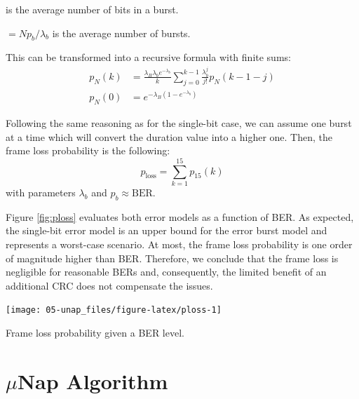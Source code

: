 \documentclass[twoside,nohyper]{tufte-book}
\providecommand{\tightlist}{%
  \setlength{\itemsep}{0pt}\setlength{\parskip}{0pt}}
\begin{document}
\begin{description}
\tightlist
\item[\(\lambda_b\)]
is the average number of bits in a burst.
\item[\(\lambda_B\)]
\(= Np_b/\lambda_b\) is the average number of bursts.
\end{description}

This can be transformed into a recursive formula with finite sums:
%
\begin{equation}
\begin{split}
 p_N(k) &= \frac{\lambda_B\lambda_b e^{-\lambda_b}}{k}\sum_{j=0}^{k-1} \frac{\lambda_b^j}{j!}p_N(k-1-j) \\
 p_N(0) &= e^{-\lambda_B\left(1-e^{-\lambda_b}\right)} 
\end{split}
\label{eq:pN0}
\end{equation}
%


Following the same reasoning as for the single-bit case, we can assume one burst at a time which will convert the duration value into a higher one. Then, the frame loss probability is the following:
%
\begin{equation}
 p_{\mathrm{loss}} = \sum_{k=1}^{15} p_{15}(k)
 \label{eq:plossburst}
\end{equation}
%
with parameters \(\lambda_b\) and \(p_b \approx \mathrm{BER}\).

Figure \ref{fig:ploss} evaluates both error models as a function of BER. As expected, the single-bit error model is an upper bound for the error burst model and represents a worst-case scenario. At most, the frame loss probability is one order of magnitude higher than BER. Therefore, we conclude that the frame loss is negligible for reasonable BERs and, consequently, the limited benefit of an additional CRC does not compensate the issues.



\begin{marginfigure}

{\centering \texttt{[image: 05-unap\_files/figure-latex/ploss-1]} 

}

\caption[Frame loss probability given a BER level.]{Frame loss probability given a BER level.}\label{fig:ploss}
\end{marginfigure}

\section{\texorpdfstring{$\mu$}{\textmu}Nap Algorithm}\label{munap-algorithm}
\end{document}
